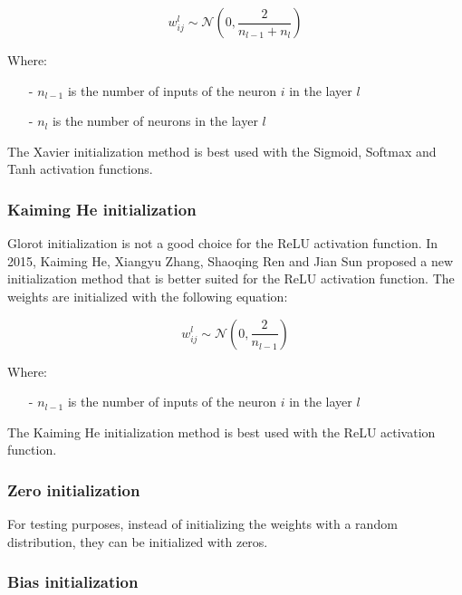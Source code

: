 \begin{equation}
    \label{eq:glorot}
    w_{ij}^l \sim \mathcal{N}\left(0, \frac{2}{n_{l-1} + n_l}\right)
\end{equation}

\noindent
Where:

\begin{itemize}
    \item[-] $n_{l-1}$ is the number of inputs of the neuron $i$ in the layer $l$
    \item[-] $n_l$ is the number of neurons in the layer $l$
\end{itemize}

The Xavier initialization method is best used with the Sigmoid, Softmax and Tanh activation functions.


\subsubsection{Kaiming He initialization}

Glorot initialization is not a good choice for the ReLU activation function. In 2015, Kaiming He, Xiangyu Zhang,
Shaoqing Ren and Jian Sun proposed a new initialization method \cite{he} that is better suited for the ReLU
activation function. The weights are initialized with the following equation:

\begin{equation}
    \label{eq:he}
    w_{ij}^l \sim \mathcal{N}\left(0, \frac{2}{n_{l-1}}\right)
\end{equation}

\noindent
Where:

\begin{itemize}
    \item[-] $n_{l-1}$ is the number of inputs of the neuron $i$ in the layer $l$
\end{itemize}

The Kaiming He initialization method is best used with the ReLU activation function.

\subsubsection{Zero initialization}

For testing purposes, instead of initializing the weights with a random distribution, they can be initialized
with zeros.

\subsubsection{Bias initialization}

